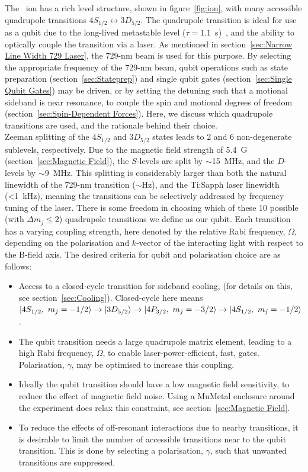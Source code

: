     The \ca~ion has a rich level structure, shown in figure~\ref{fig:ion}, with many accessible quadrupole transitions $4S_{1/2}\leftrightarrow 3D_{5/2}$. The quadrupole transition is ideal for use as a qubit due to the long-lived metastable level ($\tau=1.1$~\unit{\s})~\cite{barton2000measurement}, and the ability to optically couple the transition via a laser. As mentioned in section~\ref{sec:Narrow Line Width 729 Laser}, the 729-nm beam is used for this purpose. By selecting the appropriate frequency of the 729-nm beam, qubit operations such as state preparation (section~\ref{sec:Stateprep}) and single qubit gates (section~\ref{sec:Single Qubit Gates}) may be driven, or by setting the detuning such that a motional sideband is near resonance, to couple the spin and motional degrees of freedom (section~\ref{sec:Spin-Dependent Forces}). Here, we discuss which quadrupole transitions are used, and the rationale behind their choice.\\ 
    Zeeman splitting of the $4S_{1/2}$ and $3D_{5/2}$ states leads to 2 and 6
    non-degenerate sublevels, respectively. Due to the magnetic field strength of 5.4~G (section~\ref{sec:Magnetic Field}),
    the $S$-levels are split by $\sim$15~\unit{\MHz}, and the $D$-levels by $\sim$9~\unit{\MHz}.
    This splitting is considerably larger than both the natural linewidth of the
    729-nm transition ($\sim$\unit{\Hz}), and the Ti:Sapph laser linewidth (<1~\unit{\kHz}), meaning the transitions can be 
    selectively addressed by frequency tuning of the laser. There is some freedom in choosing which of these 10 possible (with $\Delta m_j \leq 2$) quadrupole transitions we define as our qubit. Each transition has a varying coupling strength, here denoted by the relative Rabi frequency, $\Omega$, depending on the polarisation and $k$-vector of the interacting light with respect to the B-field axis. The desired criteria for qubit and polarisation choice are as follows:
    \begin{itemize}
    \item Access to a closed-cycle transition for sideband cooling, (for details on this, see section~\ref{sec:Cooling}). Closed-cycle here means $\ket{4S_{1/2},~m_j = -1/2} \rightarrow \ket{3D_{5/2}} \rightarrow \ket{4P_{3/2},~m_j = -3/2} \rightarrow \ket{4S_{1/2},~m_j = -1/2}$.
    \item The qubit transition needs a large quadrupole matrix element, leading to a high Rabi frequency, $\Omega$, to enable laser-power-efficient, fast, gates. Polarisation, $\gamma$, may be optimised to increase this coupling.
    \item Ideally the qubit transition should have a low magnetic field sensitivity, to reduce the effect of magnetic field noise. Using a MuMetal enclosure around the experiment does relax this constraint, see section~\ref{sec:Magnetic Field}.
    \item To reduce the effects of off-resonant interactions due to nearby transitions, it is desirable to limit the number of accessible transitions near to the qubit transition. This is done by selecting a polarisation, $\gamma$, such that unwanted transitions are suppressed.
    \end{itemize}
